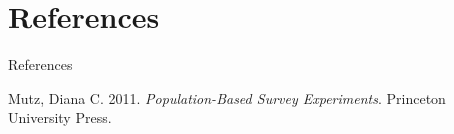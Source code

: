 \documentclass[
  ignorenonframetext,
]{beamer}
\newlength{\cslhangindent}
\newlength{\cslentryspacingunit} %
\newenvironment{CSLReferences}[2] %
 {%
  \setlength{\parindent}{0pt}
  \ifodd #1
  \let\oldpar\par
  \def\par{\hangindent=\cslhangindent\oldpar}
  \fi
  \setlength{\parskip}{#2\cslentryspacingunit}
 }%
 {}
\begin{document}
\hypertarget{references}{%
\section*{References}\label{references}}

\begin{frame}{References}
\hypertarget{refs}{}
\begin{CSLReferences}{1}{0}
\leavevmode{}%
Mutz, Diana C. 2011. \emph{Population-Based Survey Experiments}.
Princeton University Press.

\end{CSLReferences}
\end{frame}
\end{document}

